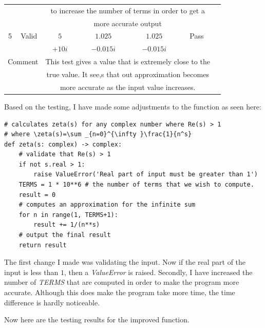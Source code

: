 \documentclass{article}
\begin{document}
\begin{table}[ht]
\begin{tabular}{|c|c|c|c|c|c|c|}
    \multicolumn{2}{|c|}{} & \multicolumn{4}{|c|}{to increase the number of terms in order to get a}\\
    \multicolumn{2}{|c|}{} & \multicolumn{4}{|c|}{more accurate output}\\
    \hline
    \hline
    5 & Valid & $5$ & $1.025$ & $1.025$ & Pass\\
      & & $+10i$ & $-0.015i$ & $-0.015i$  & \\
    \hline
    \multicolumn{2}{|c|}{Comment} & \multicolumn{4}{|c|}{This test gives a value that is extremely close to the}\\
    \multicolumn{2}{|c|}{} & \multicolumn{4}{|c|}{true value. It see,s that out approximation becomes}\\
    \multicolumn{2}{|c|}{} & \multicolumn{4}{|c|}{more accurate as the input value increases.}\\
    \hline
    \end{tabular}
\end{table}
\clearpage
Based on the testing, I have made some adjustments to the function as seen here:

\begin{lstlisting}
# calculates zeta(s) for any complex number where Re(s) > 1
# where \zeta(s)=\sum _{n=0}^{\infty }\frac{1}{n^s}
def zeta(s: complex) -> complex:
    # validate that Re(s) > 1
    if not s.real > 1:
        raise ValueError('Real part of input must be greater than 1')
    TERMS = 1 * 10**6 # the number of terms that we wish to compute.
    result = 0
    # computes an approximation for the infinite sum
    for n in range(1, TERMS+1):
        result += 1/(n**s)
    # output the final result
    return result
\end{lstlisting}

The first change I made was validating the input. Now if the real part of the input is less than $1$, then a \textit{ValueError} is raised. Secondly, I have increased the number of \textit{TERMS} that are computed in order to make the program more accurate. Although this does make the program take more time, the time difference is hardly noticeable.

Now here are the testing results for the improved function.
\end{document}
